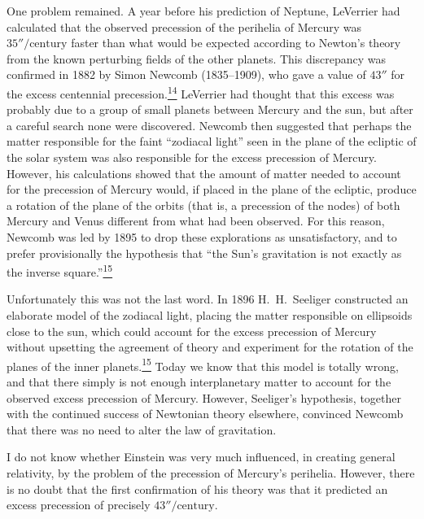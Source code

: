 One problem remained. A year before his prediction of Neptune, LeVerrier had
calculated that the observed precession of the perihelia of Mercury was
\(35''/\text{century}\) faster than what would be expected according to
Newton's theory from the known perturbing fields of the other planets. This
discrepancy was confirmed in 1882 by Simon Newcomb (1835--1909), who gave a
value of \(43''\) for the excess centennial
precession.\hyperref[ch1-ref-14]{\textsuperscript{14}} LeVerrier had thought
that this excess was probably due to a group of small planets between Mercury
and the sun, but after a careful search none were discovered. Newcomb then
suggested that perhaps the matter responsible for the faint ``zodiacal light''
seen in the plane of the ecliptic of the solar system was also responsible for
the excess precession of Mercury. However, his calculations showed that the
amount of matter needed to account for the precession of Mercury would, if
placed in the plane of the ecliptic, produce a rotation of the plane of the
orbits (that is, a precession of the nodes) of both Mercury and Venus
different from what had been observed. For this reason, Newcomb was led by
1895 to drop these explorations as unsatisfactory, and to prefer provisionally
the hypothesis that ``the Sun's gravitation is not exactly as the inverse
square.''\hyperref[ch1-ref-15]{\textsuperscript{15}}

Unfortunately this was not the last word. In 1896 H.\ H.\ Seeliger constructed
an elaborate model of the zodiacal light, placing the matter responsible on
ellipsoids close to the sun, which could account for the
excess precession of Mercury without upsetting the agreement of theory and
experiment for the rotation of the planes of the inner
planets.\hyperref[ch1-ref-15]{\textsuperscript{15}} Today we know that this
model is totally wrong, and that there simply is not enough interplanetary
matter to account for the observed excess precession of Mercury. However,
Seeliger's hypothesis, together with the continued success of Newtonian theory
elsewhere, convinced Newcomb that there was no need to alter the law of
gravitation.

I do not know whether Einstein was very much influenced, in creating general
relativity, by the problem of the precession of Mercury's perihelia. However,
there is no doubt that the first confirmation of his theory was that it
predicted an excess precession of precisely \(43''/\text{century}\).
